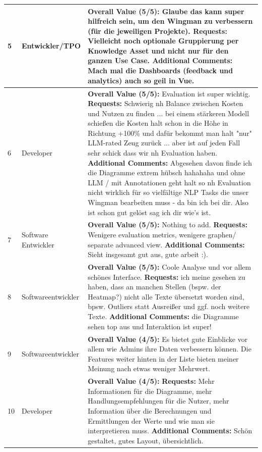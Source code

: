 \documentclass[
	english,
	ruledheaders=section,%
	class=report,%
	thesis={type=bachelor},%
	accentcolor=1b,%
	custommargins=true,%
	marginpar=false,%
	parskip=half-,%
	fontsize=11pt,%
	DIV=14,
]{tudapub}
\begin{document}
\begin{longtable}{l >{\RaggedRight}p{3cm} >{\RaggedRight}p{10cm}}
    \midrule
    5 & Entwickler/TPO & \textbf{Overall Value (5/5):} Glaube das kann super hilfreich sein, um den Wingman zu verbessern (für die jeweiligen Projekte). \textbf{Requests:} Vielleicht noch optionale Gruppierung per Knowledge Asset und nicht nur für den ganzen Use Case. \textbf{Additional Comments:} Mach mal die Dashboards (feedback und analytics) auch so geil in Vue. \\
    \midrule
    6 & Developer & \textbf{Overall Value (5/5):} Evaluation ist super wichtig. \textbf{Requests:} Schwierig nh Balance zwischen Kosten und Nutzen zu finden ... bei einem stärkeren Modell schießen die Kosten halt schon in die Höhe in Richtung +100\% und dafür bekommt man halt "nur" LLM-rated Zeug zurück ... aber ist auf jeden Fall sehr schick dass wir nh Evaluation haben. \textbf{Additional Comments:} Abgesehen davon finde ich die Diagramme extrem hübsch hahahaha und ohne LLM / mit Annotationen geht halt so nh Evaluation nicht wirklich für so vielfältige NLP Tasks die unser Wingman bearbeiten muss - da bin ich bei dir. Also ist schon gut gelöst sag ich dir wie's ist. \\
    \midrule
    7 & Software Entwickler & \textbf{Overall Value (5/5):} Nothing to add. \textbf{Requests:} Wenigere evaluation metrics, wenigere graphen/ separate advanced view. \textbf{Additional Comments:} Sieht insgesamt gut aus, gute arbeit :). \\
    \midrule
    8 & Softwareentwickler & \textbf{Overall Value (5/5):} Coole Analyse und vor allem schönes Interface. \textbf{Requests:} ich meine gesehen zu haben, dass an manchen Stellen (bspw. der Heatmap?) nicht alle Texte übersetzt worden sind, bpsw. Outliers statt Ausreißer und ggf. noch weitere Texte. \textbf{Additional Comments:} die Diagramme sehen top aus und Interaktion ist super! \\
    \midrule
    9 & Softwareentwickler & \textbf{Overall Value (4/5):} Es bietet gute Einblicke vor allem wie Admins ihre Daten verbessern können. Die Features weiter hinten in der Liste bieten meiner Meinung nach etwas weniger Mehrwert. \\
    \midrule
    10 & Developer & \textbf{Overall Value (4/5):} \textbf{Requests:} Mehr Informationen für die Diagramme, mehr Handlungsempfehlungen für die Nutzer, mehr Information über die Berechnungen und Ermittlungen der Werte und wie man sie interpretieren muss. \textbf{Additional Comments:} Schön gestaltet, gutes Layout, übersichtlich. \\
\end{longtable}

\printbibliography
\newpage
\mbox{}
\end{document}
